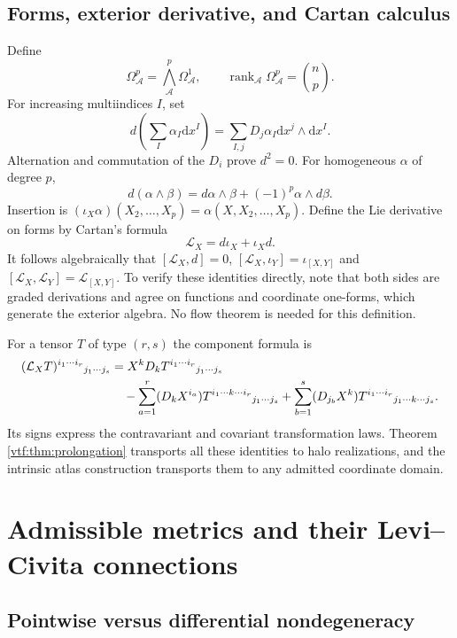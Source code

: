 \documentclass[11pt,letterpaper]{article}
\theoremstyle{definition}
\theoremstyle{remark}
\newcommand{\A}{\mathscr A}\newcommand{\OO}{\mathcal O}\newcommand{\mm}{\mathfrak m}
\newcommand{\Lie}{\mathcal L}\newcommand{\HH}{\mathcal H}
\newcommand{\dd}{\mathrm d}
\begin{document}
\subsection{Forms, exterior derivative, and Cartan calculus}

Define
\[
 \Omega^p_\A=\bigwedge^p_\A\Omega^1_\A,
 \qquad \operatorname{rank}_\A\Omega^p_\A=\binom np.
\]
For increasing multiindices $I$, set
\[
 d\left(\sum_I\alpha_I\dd x^I\right)
   =\sum_{I,j}D_j\alpha_I\dd x^j\wedge\dd x^I.
\]
Alternation and commutation of the $D_i$ prove $d^2=0$. For homogeneous
$\alpha$ of degree $p$,
\[
 d(\alpha\wedge\beta)=d\alpha\wedge\beta+(-1)^p\alpha\wedge d\beta.
\]
Insertion is $(\iota_X\alpha)(X_2,\ldots,X_p)=\alpha(X,X_2,\ldots,X_p)$.
Define the Lie derivative on forms by Cartan's formula
\begin{equation}\label{vtf:eq:cartan}
 \Lie_X=d\iota_X+\iota_Xd.
\end{equation}
It follows algebraically that $[\Lie_X,d]=0$,
$[\Lie_X,\iota_Y]=\iota_{[X,Y]}$ and
$[\Lie_X,\Lie_Y]=\Lie_{[X,Y]}$. To verify these identities directly, note
that both sides are graded derivations and agree on functions and coordinate
one-forms, which generate the exterior algebra. No flow theorem is needed
for this definition.

For a tensor $T$ of type $(r,s)$ the component formula is
\begin{align}\label{vtf:eq:lietensor}
 (\Lie_XT)^{i_1\cdots i_r}{}_{j_1\cdots j_s}
 &=X^kD_kT^{i_1\cdots i_r}{}_{j_1\cdots j_s}\notag\\
 &\quad-\sum_{a=1}^r(D_kX^{i_a})
 T^{i_1\cdots k\cdots i_r}{}_{j_1\cdots j_s}
 +\sum_{b=1}^s(D_{j_b}X^k)
 T^{i_1\cdots i_r}{}_{j_1\cdots k\cdots j_s}.
\end{align}
Its signs express the contravariant and covariant transformation laws.
Theorem \ref{vtf:thm:prolongation} transports all these identities to halo
realizations, and the intrinsic atlas construction transports them to any
admitted coordinate domain.

\section{Admissible metrics and their Levi--Civita connections}\label{vtf:sec:metric}

\subsection{Pointwise versus differential nondegeneracy}
\end{document}
